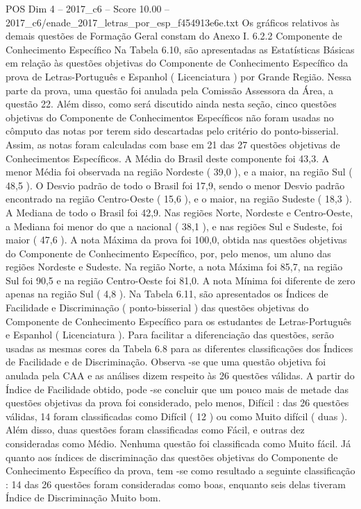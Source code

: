 \begin{textsample}{POS Dim 4 – 2017\_c6 – Score 10.00 – 2017\_c6/enade\_2017\_letras\_por\_esp\_f454913e6e.txt}
Os gráficos relativos às demais questões de Formação Geral constam do Anexo I. 6.2.2 Componente de Conhecimento Específico Na Tabela 6.10, são apresentadas as Estatísticas Básicas em relação às questões objetivas do Componente de Conhecimento Específico da prova de Letras-Português e Espanhol ( Licenciatura ) por Grande Região.
Nessa parte da prova, uma questão foi anulada pela Comissão Assessora da Área, a questão 22.
Além disso, como será discutido ainda nesta seção, cinco questões objetivas do Componente de Conhecimentos Específicos não foram usadas no cômputo das notas por terem sido descartadas pelo critério do ponto-bisserial.
Assim, as notas foram calculadas com base em 21 das 27 questões objetivas de Conhecimentos Específicos.
A Média do Brasil deste componente foi 43,3.
A menor Média foi observada na região Nordeste ( 39,0 ), e a maior, na região Sul ( 48,5 ).
O Desvio padrão de todo o Brasil foi 17,9, sendo o menor Desvio padrão encontrado na região Centro-Oeste ( 15,6 ), e o maior, na região Sudeste ( 18,3 ).
A Mediana de todo o Brasil foi 42,9.
Nas regiões Norte, Nordeste e Centro-Oeste, a Mediana foi menor do que a nacional ( 38,1 ), e nas regiões Sul e Sudeste, foi maior ( 47,6 ).
A nota Máxima da prova foi 100,0, obtida nas questões objetivas do Componente de Conhecimento Específico, por, pelo menos, um aluno das regiões Nordeste e Sudeste.
Na região Norte, a nota Máxima foi 85,7, na região Sul foi 90,5 e na região Centro-Oeste foi 81,0.
A nota Mínima foi diferente de zero apenas na região Sul ( 4,8 ).
Na Tabela 6.11, são apresentados os Índices de Facilidade e Discriminação ( ponto-bisserial ) das questões objetivas do Componente de Conhecimento Específico para os estudantes de Letras-Português e Espanhol ( Licenciatura ).
Para facilitar a diferenciação das questões, serão usadas as mesmas cores da Tabela 6.8 para as diferentes classificações dos Índices de Facilidade e de Discriminação.
Observa -se que uma questão objetiva foi anulada pela CAA e as análises dizem respeito às 26 questões válidas.
A partir do Índice de Facilidade obtido, pode -se concluir que um pouco mais de metade das questões objetivas da prova foi considerado, pelo menos, Difícil : das 26 questões válidas, 14 foram classificadas como Difícil ( 12 ) ou como Muito difícil ( duas ).
Além disso, duas questões foram classificadas como Fácil, e outras dez consideradas como Médio.
Nenhuma questão foi classificada como Muito fácil.
Já quanto aos índices de discriminação das questões objetivas do Componente de Conhecimento Específico da prova, tem -se como resultado a seguinte classificação : 14 das 26 questões foram consideradas como boas, enquanto seis delas tiveram Índice de Discriminação Muito bom.

\end{textsample}
